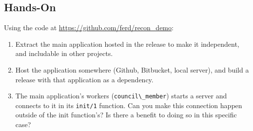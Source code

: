 \documentclass[11pt, oneside]{book}   	%
\newcommand{\module}[1]{\Verb`#1`}
\newcommand{\function}[1]{\Verb`#1`}
\begin{document}
\subsection{Hands-On}

Using the code at \href{https://github.com/ferd/recon\_demo}{https://github.com/ferd/recon\_demo}:

\begin{enumerate}
	\item Extract the main application hosted in the release to make it independent, and includable in other projects.
	\item Host the application somewhere (Github, Bitbucket, local server), and build a release with that application as a dependency.
	\item The main application's workers (\module{council\_member}) starts a server and connects to it in its \function{init/1} function. Can you make this connection happen outside of the init function's? Is there a benefit to doing so in this specific case?
\end{enumerate}

\end{document}
